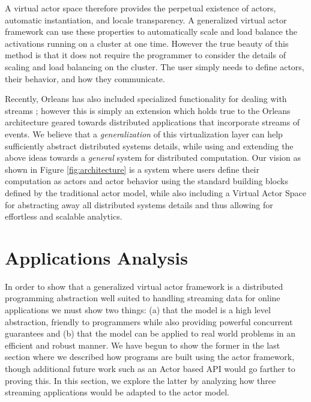 \documentclass[conference,twocolumn,10pt]{IEEEtran}
\begin{document}
A virtual actor space therefore provides the perpetual existence of actors, automatic instantiation, and locale transparency. A generalized virtual actor framework can use these properties to automatically scale and load balance the activations running on a cluster at one time. However the true beauty of this method is that it does not require the programmer to consider the details of scaling and load balancing on the cluster. The user simply needs to define actors, their behavior, and how they communicate.

Recently, Orleans has also included specialized functionality for dealing with streams \cite{research_microsoft_2015}; however this is simply an extension which holds true to the Orleans architecture geared towards distributed applications that incorporate streams of events. We believe that a \textit{generalization} of this virtualization layer can help sufficiently abstract distributed systems details, while using and extending the above ideas towards a \textit{general} system for distributed computation. Our vision as shown in Figure \ref{fig:architecture} is a system where users define their computation as actors and actor behavior using the standard building blocks defined by the traditional actor model, while also including a Virtual Actor Space for abstracting away all distributed systems details and thus allowing for effortless and scalable analytics.




\section{Applications Analysis}

In order to show that a generalized virtual actor framework is a distributed programming abstraction well suited to handling streaming data for online applications we must show two things: (a) that the model is a high level abstraction, friendly to programmers while also providing powerful concurrent guarantees and (b) that the model can be applied to real world problems in an efficient and robust manner. We have begun to show the former in the last section where we described how programs are built using the actor framework, though additional future work such as an Actor based API would go farther to proving this. In this section, we explore the latter by analyzing how three streaming applications would be adapted to the actor model.
\end{document}
